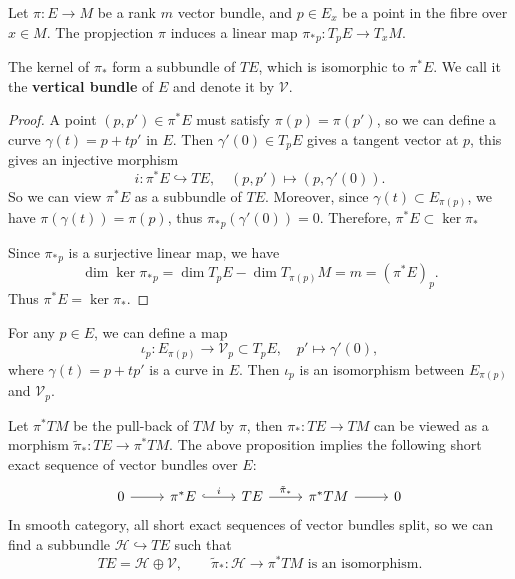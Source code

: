 Let $\pi:E\to M$ be a rank $m$ vector bundle, and $p\in E_x$ be a point in the fibre over $x\in M$. 
The propjection $\pi$ induces a linear map $\pi_*{}_p: T_p E \to T_x M$. 
\begin{proposition}
    The kernel of $\pi_*$ form a subbundle of $TE$, which is isomorphic to $\pi^* E$. 
    We call it the \textbf{vertical bundle} of $E$ and denote it by $\mathcal{V}$.
\end{proposition}
\begin{proof}
    A point $(p,p')\in \pi^* E$ must satisfy $\pi(p) = \pi(p')$, so we can define a curve $\gamma(t) = p + t p'$ in $E$.
    Then $\gamma'(0) \in T_p E$ gives a tangent vector at $p$, this gives an injective morphism 
    \begin{equation*}
        i: \pi^* E \hookrightarrow TE, \quad (p,p') \mapsto (p,\gamma'(0)).
    \end{equation*}
    So we can view $\pi^* E$ as a subbundle of $TE$. 
    Moreover, since $\gamma(t)\subset E_{\pi(p)}$, we have $\pi(\gamma(t)) = \pi(p)$, thus $\pi_*{}_p(\gamma'(0)) = 0$. 
    Therefore, $\pi^* E\subset \ker\pi_*$ 

    Since $\pi_*{}_p$ is a surjective linear map, we have 
    \begin{equation*}
        \dim \ker \pi_*{}_p = \dim T_p E - \dim T_{\pi(p)} M = m = (\pi^* E)_p.
    \end{equation*}
    Thus $\pi^* E = \ker \pi_*$.
\end{proof}
For any $p\in E$, we can define a map 
\begin{equation*}
    \iota_p: E_{\pi(p)} \to \mathcal{V}_p\subset T_p E, \quad p' \mapsto \gamma'(0),
\end{equation*}
where $\gamma(t) = p + t p'$ is a curve in $E$. 
Then $\iota_p$ is an isomorphism between $E_{\pi(p)}$ and $\mathcal{V}_p$.

Let $\pi^*TM$ be the pull-back of $TM$ by $\pi$, then $\pi_*: TE \to TM$ can be viewed as 
a morphism $\tilde{\pi}_*: TE \to \pi^* TM$. 
The above proposition implies the following short exact sequence of vector bundles over $E$:
\[\begin{tikzcd}
    0 & {\pi^*E} & TE & {\pi^*TM} & 0
    \arrow[from=1-1, to=1-2]
    \arrow["i", hook, from=1-2, to=1-3]
    \arrow["\tilde{\pi}_*", from=1-3, to=1-4]
    \arrow[from=1-4, to=1-5]
\end{tikzcd}\]
In smooth category, all short exact sequences of vector bundles split, 
so we can find a subbundle $\mathcal{H}\hookrightarrow TE$ such that 
\begin{equation*}
    TE = \mathcal{H} \oplus \mathcal{V}, \qquad \tilde{\pi}_*: \mathcal{H} \to \pi^* TM \text{ is an isomorphism}.
\end{equation*}


